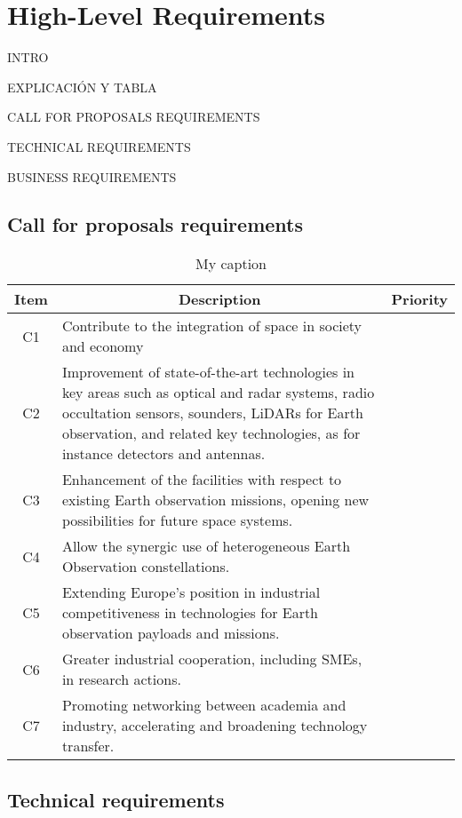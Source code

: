 \section{High-Level Requirements}

INTRO

EXPLICACIÓN Y TABLA

CALL FOR PROPOSALS REQUIREMENTS

TECHNICAL REQUIREMENTS

BUSINESS REQUIREMENTS

\subsection{Call for proposals requirements}

\begin{table}[]
	\centering
	\caption{My caption}
	\label{my-label}
	\begin{tabular}{|c|l|l|}
		\hline
		\textbf{Item} & \multicolumn{1}{c|}{\textbf{Description}} & \multicolumn{1}{c|}{\textbf{Priority}} \\ \hline
		C1 & Contribute to the integration of space in society and economy &  \\ \hline
		C2 & Improvement of state-of-the-art technologies in key areas such as optical and radar systems, radio occultation sensors, sounders, LiDARs for Earth observation, and related key technologies, as for instance detectors and antennas. &  \\ \hline
		C3 & Enhancement of the facilities with respect to existing Earth observation missions, opening new possibilities for future space systems. &  \\ \hline
		C4 & Allow the synergic use of heterogeneous Earth Observation constellations. &  \\ \hline
		C5 & Extending Europe's position in industrial competitiveness in technologies for Earth observation payloads and missions. &  \\ \hline
		C6 & Greater industrial cooperation, including SMEs, in research actions. &  \\ \hline
		C7 & Promoting networking between academia and industry, accelerating and broadening technology transfer. &  \\ \hline
	\end{tabular}
\end{table}



\subsection{Technical requirements}

